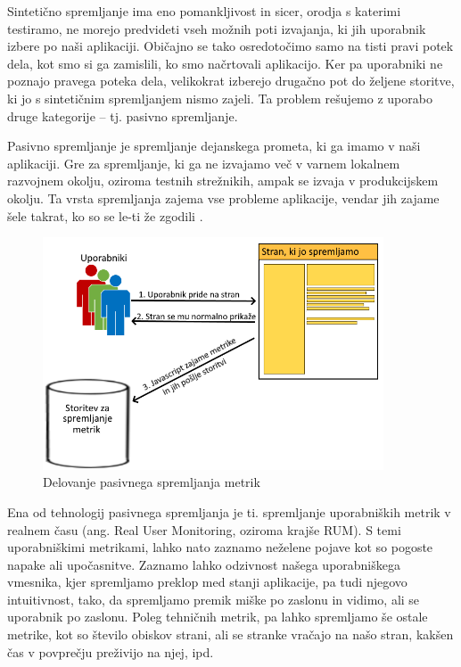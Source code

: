 \documentclass[a4paper, 12pt]{book}
\begin{document}
Sintetično spremljanje ima eno pomankljivost in sicer, orodja s katerimi testiramo, ne morejo predvideti vseh možnih poti izvajanja, ki jih uporabnik izbere po naši aplikaciji. Običajno se tako osredotočimo samo na tisti pravi potek dela, kot smo si ga zamislili, ko smo načrtovali aplikacijo. Ker pa uporabniki ne poznajo pravega poteka dela, velikokrat izberejo drugačno pot do željene storitve, ki jo s sintetičnim spremljanjem nismo zajeli. Ta problem rešujemo z uporabo druge kategorije – tj.  pasivno spremljanje.

Pasivno spremljanje je spremljanje dejanskega prometa, ki ga imamo v naši aplikaciji. Gre za spremljanje, ki ga ne izvajamo več v varnem lokalnem razvojnem okolju, oziroma testnih strežnikih, ampak se izvaja v produkcijskem okolju. Ta vrsta spremljanja zajema vse probleme aplikacije, vendar jih zajame šele takrat, ko so se le-ti že zgodili \cite{rum_o_reilly}.

\begin{figure}[h]
	\begin{center}
		\includegraphics[width=0.9\textwidth]{rum_diagram.png}
	\end{center}
	\caption{Delovanje pasivnega spremljanja metrik}
	\label{img:rum}
\end{figure}

Ena od tehnologij pasivnega spremljanja je ti. spremljanje uporabniških metrik v realnem času (ang. Real User Monitoring, oziroma krajše RUM). S temi uporabniškimi metrikami, lahko nato zaznamo neželene pojave kot so pogoste napake ali upočasnitve. Zaznamo lahko odzivnost našega uporabniškega vmesnika, kjer spremljamo preklop med stanji aplikacije, pa tudi njegovo intuitivnost, tako, da spremljamo premik miške po zaslonu in vidimo, ali se uporabnik  po zaslonu. Poleg tehničnih metrik, pa lahko spremljamo še ostale metrike, kot so število obiskov strani, ali se stranke vračajo na našo stran, kakšen čas v povprečju preživijo na njej, ipd.
\end{document}
